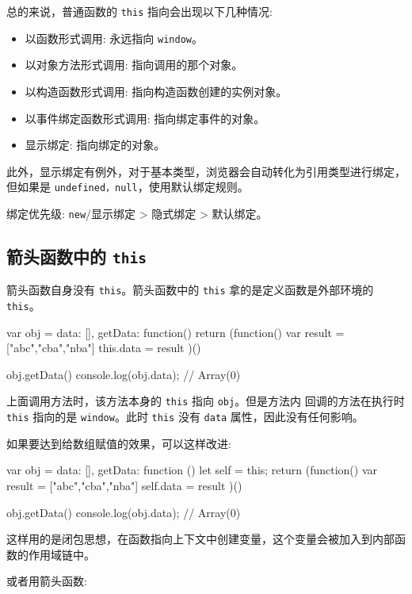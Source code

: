 总的来说，普通函数的 \texttt{this} 指向会出现以下几种情况:
\begin{itemize}
  \item 以函数形式调用: 永远指向 \texttt{window}。
  \item 以对象方法形式调用: 指向调用的那个对象。
  \item 以构造函数形式调用: 指向构造函数创建的实例对象。
  \item 以事件绑定函数形式调用: 指向绑定事件的对象。
  \item 显示绑定: 指向绑定的对象。
\end{itemize}

此外，显示绑定有例外，对于基本类型，浏览器会自动转化为引用类型进行绑定，但如果是 \texttt{undefined，null}，使用默认绑定规则。

绑定优先级: \texttt{new}/显示绑定 > 隐式绑定 > 默认绑定。

\subsection{箭头函数中的 \texttt{this}}

箭头函数自身没有 \texttt{this}。箭头函数中的 \texttt{this} 拿的是定义函数是外部环境的 \texttt{this}。

\begin{JavaScript}
var obj = {
  data: [],
  getData: function() {
    return (function() {
      var result = ["abc","cba","nba"]
      this.data = result
    })()
  }
}
 
obj.getData()
console.log(obj.data);  // Array(0)
\end{JavaScript}

上面调用方法时，该方法本身的 \texttt{this} 指向 \texttt{obj}。但是方法内 回调的方法在执行时 \texttt{this} 指向的是 \texttt{window}。此时 \texttt{this} 没有 \texttt{data} 属性，因此没有任何影响。

如果要达到给数组赋值的效果，可以这样改进:

\begin{JavaScript}
var obj = {
  data: [],
  getData: function () {
    let self = this;
    return (function() {
      var result = ["abc","cba","nba"]
      self.data = result
    })()
  }
}
 
obj.getData()
console.log(obj.data);  // Array(0)
\end{JavaScript}

这样用的是闭包思想，在函数指向上下文中创建变量，这个变量会被加入到内部函数的作用域链中。

或者用箭头函数:

